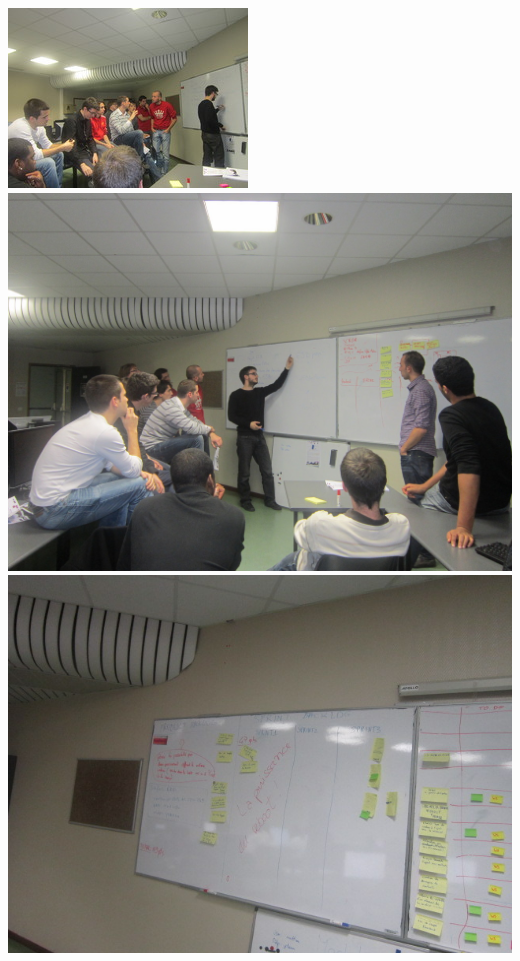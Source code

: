 \documentclass[a4paper,francais,titlepage]{report}
\begin{document}
\begin{center}
\includegraphics[scale=0.3]{brainstorming6.jpeg}
\includegraphics[scale=0.3]{brainstorming7.jpeg}
\includegraphics[scale=0.3]{tableau.jpeg}

\end{center}
\end{document}
